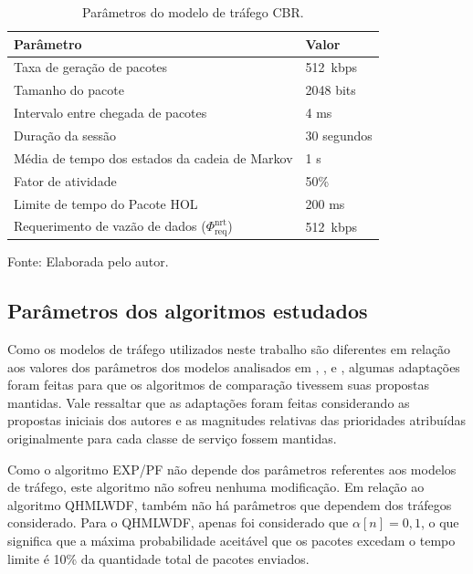 \begin{table}[!ht]
	\centering
	\begin{threeparttable}[t]
		\caption{Parâmetros do modelo de tráfego CBR.}
		\label{Tab:Par_CBR}
		\centering
		\small
		\begin{tabular}[t]{ll}
			\toprule
			\textbf{Parâmetro} & \textbf{Valor}\\
			\midrule
			Taxa de geração de pacotes & 512~kbps\\
			\midrule
			Tamanho do pacote & 2048 bits\\
			\midrule
			Intervalo entre chegada de pacotes & 4 ms\\
			\midrule
			Duração da sessão & 30 segundos\\
			\midrule
			Média de tempo dos estados da cadeia de Markov & 1 s\\
			\midrule
			Fator de atividade & 50\%\\
			\midrule
			Limite de tempo do Pacote HOL & 200 ms\\
			\midrule
			Requerimento de vazão de dados ($\Phi_{\text{req}}^{\text{nrt}}$) & 512~kbps \\
			\bottomrule
		\end{tabular}
		{Fonte: Elaborada pelo autor.}
	\end{threeparttable}	
\end{table}

\subsection{Parâmetros dos algoritmos estudados}

Como os modelos de tráfego utilizados neste trabalho são diferentes em relação aos valores dos parâmetros dos modelos analisados em , ,  e , algumas adaptações foram feitas para que os algoritmos de comparação tivessem suas propostas mantidas. Vale ressaltar que as adaptações foram feitas considerando as propostas iniciais dos autores e as magnitudes relativas das prioridades atribuídas originalmente para cada classe de serviço fossem mantidas.    

Como o algoritmo EXP/PF não depende dos parâmetros referentes aos modelos de tráfego, este algoritmo não sofreu nenhuma modificação. Em relação ao algoritmo QHMLWDF, também não há parâmetros que dependem dos tráfegos considerado. Para o QHMLWDF, apenas foi considerado que $\alpha[n] = 0,1$, o que significa que a máxima probabilidade aceitável que os pacotes excedam o tempo limite é 10\% da quantidade total de pacotes enviados. 

